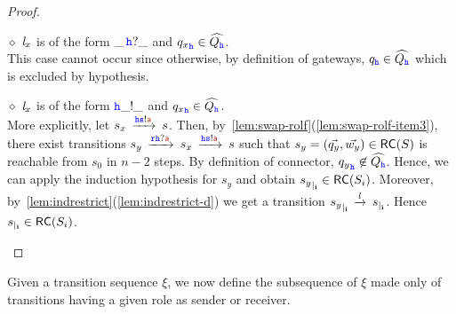 \begin{proof}
\begin{description}
%
\item
\underline{$\diamond$}
$\mathit{l}_x$ is of the form $\_\,{\mathtt{\color{blue}{ {h}}}}?\_$ and ${q_x}_{\mathtt{\color{blue}{ {h}}}}\in\widehat{Q_{{\mathtt{\color{blue}{ {h}}}}}}$.\\
This case cannot occur since otherwise,
by definition of gateways,
${q}_{{\mathtt{\color{blue}{ {h}}}}}\in\widehat{Q_{{\mathtt{\color{blue}{ {h}}}}}}$ which is excluded by hypothesis. 
%
\item
\underline{$\diamond$}
$\mathit{l}_x$ is of the form ${\mathtt{\color{blue}{ {h}}}}\_!\_$  and ${q_x}_{\mathtt{\color{blue}{ {h}}}}\in\widehat{Q_{{\mathtt{\color{blue}{ {h}}}}}}$.\\
More explicitly, let $s_x\lts{\HH\tts!\msg[a]}s$.
Then, by~\cref{lem:swap-rolf}(\ref{lem:swap-rolf-item3}), there exist
transitions
$s_y \lts{\ttr\HH?\msg[a]}s_x\lts{\HH\tts!\msg[a]}s$
such that $s_y = (\vec{q_y},\vec{w_y})\in \mathsf{RC}(S)$ is reachable from $s_0$ in $n-2$ steps. By definition of connector, ${q_y}_{{\mathtt{\color{blue}{ {h}}}}} \not\in\widehat{Q_{{\mathtt{\color{blue}{ {h}}}}}}$.
Hence, we can apply the induction hypothesis for $s_y$ and obtain ${s_y}_{\mid_{\mathbf{i}}}\in \mathsf{RC}(S_i)$.
Moreover, by~\cref{lem:indrestrict}(\ref{lem:indrestrict-d}) we get a transition
${s_y}_{\mid_{\mathbf{i}}}\,\xrightarrow{\mathit{l}}_{{}}\,{s}_{\mid_{\mathbf{i}}}$. Hence ${s}_{\mid_{\mathbf{i}}}\in \mathsf{RC}(S_i)$.
\end{description}
\end{proof}


Given a transition sequence $\xi$, we now define the subsequence of $\xi$ made only
of transitions having a given role as
sender or receiver.



